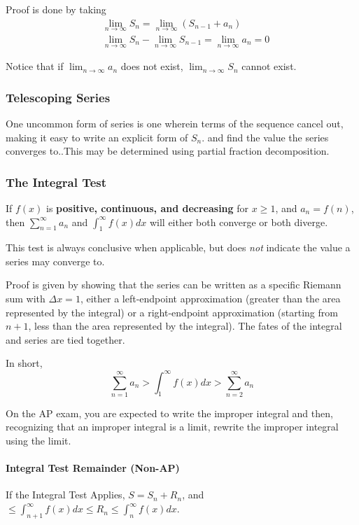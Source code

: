 \documentclass{article}
\begin{document}
Proof is done by taking
\begin{align*}
    &\lim_{n\to \infty} S_n = \lim_{n\to \infty} \left( S_{n-1} + a_{n} \right) \\
    &\lim_{n\to \infty} S_n - \lim_{n\to \infty} S_{n-1} = \lim_{n\to \infty} a_n = 0
\end{align*}

Notice that if $\lim_{n\to \infty} a_n$ does not exist, $\lim_{n\to \infty} S_n$ cannot exist.

\subsubsection{Telescoping Series} One uncommon form of series is one wherein terms of the sequence cancel out, making it easy to write an explicit form of $S_n$. and find the value the series converges to..This may be determined using partial fraction decomposition.

\subsubsection{The Integral Test} If $f(x)$ is \textbf{positive, continuous, and decreasing} for $x\ge1$, and $a_n = f(n)$, then $\sum_{n=1}^{\infty} a_n$ and $\int_{1}^{\infty} f(x) dx$ will either both converge or both diverge.

This test is always conclusive when applicable, but does \emph{not} indicate the value a series may converge to.

Proof is given by showing that the series can be written as a specific Riemann sum with $\Delta x = 1$, either a left-endpoint approximation (greater than the area represented by the integral) or a right-endpoint approximation (starting from $n+1$, less than the area represented by the integral). The fates of the integral and series are tied together.

In short,
$$\sum_{n=1}^{\infty} a_n > \int_{1}^{\infty} f(x)dx > \sum_{n=2}^{\infty} a_n$$

On the AP exam, you are expected to write the improper integral and then, recognizing that an improper integral is a limit, rewrite the improper integral using the limit.

\paragraph{Integral Test Remainder (Non-AP)} If the Integral Test Applies, $S=S_n+R_n$, and $\le \int_{n+1}^{\infty} f(x)dx \le R_n \le \int_{n}^{\infty} f(x)dx$.
\end{document}
